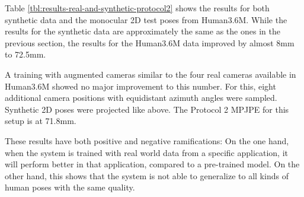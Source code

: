 

Table \ref{tbl:results-real-and-synthetic-protocol2} shows the results for both synthetic data and the monocular 2D test poses from Human3.6M.
While the results for the synthetic data are approximately the same as the ones in the previous section, the results for the Human3.6M data improved by almost 8mm to 72.5mm.

A training with augmented cameras similar to the four real cameras available in Human3.6M showed no major improvement to this number.
For this, eight additional camera positions with equidistant azimuth angles were sampled.
Synthetic 2D poses were projected like above.
The Protocol 2 MPJPE for this setup is at 71.8mm.

These results have both positive and negative ramifications:
On the one hand, when the system is trained with real world data from a specific application, it will perform better in that application, compared to a pre-trained model.
On the other hand, this shows that the system is not able to generalize to all kinds of human poses with the same quality. 

